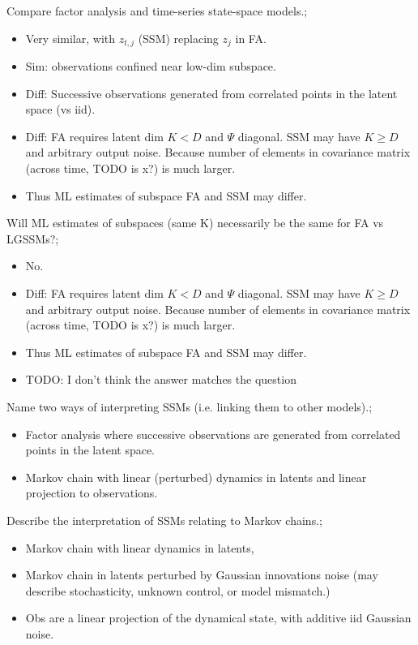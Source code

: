 \documentclass{article}
\begin{document}
Compare factor analysis and time-series state-space models.; \begin{itemize} \item Very similar, with $z_{t,j}$ (SSM) replacing $z_j$ in FA.  \item Sim: observations confined near low-dim subspace.  \item Diff: Successive observations generated from correlated points in the latent space (vs iid).  \item Diff: FA requires latent dim $K<D$ and $\Psi$ diagonal. SSM may have $K\geq D$ and arbitrary output noise. Because number of elements in covariance matrix (across time, TODO is x?) is much larger.  \item Thus ML estimates of subspace FA and SSM may differ.  \end{itemize}

Will ML estimates of subspaces (same K) necessarily be the same for FA vs LGSSMs?; \begin{itemize} \item No.  \item Diff: FA requires latent dim $K<D$ and $\Psi$ diagonal. SSM may have $K\geq D$ and arbitrary output noise. Because number of elements in covariance matrix (across time, TODO is x?) is much larger.  \item Thus ML estimates of subspace FA and SSM may differ. \item TODO: I don't think the answer matches the question \end{itemize} 

Name two ways of interpreting SSMs (i.e. linking them to other models).; \begin{itemize} \item Factor analysis where successive observations are generated from correlated points in the latent space.  \item Markov chain with linear (perturbed) dynamics in latents and linear projection to observations.  \end{itemize}

Describe the interpretation of SSMs relating to Markov chains.; \begin{itemize} \item Markov chain with linear dynamics in latents, \item Markov chain in latents perturbed by Gaussian innovations noise (may describe stochasticity, unknown control, or model mismatch.) \item Obs are a linear projection of the dynamical state, with additive iid Gaussian noise.  \end{itemize}
\end{document}
